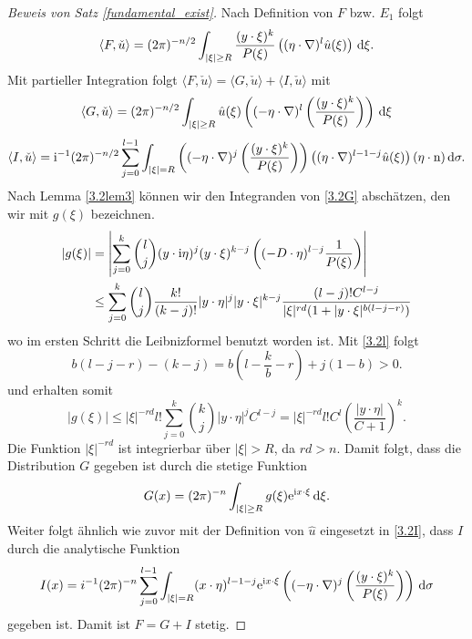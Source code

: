 \begin{proof}[Beweis von Satz \ref{fundamental_exist}]
Nach Definition von $F$ bzw. $E_1$ folgt 
\begin{equation}\label{3.2F}
\langle F, \check u\rangle = (2\pi)^{-n/2} \int_{|\xi|\ge R} \frac{(y\cdot \xi)^k}{P(\xi)} \left ( (\eta\cdot \nabla)^l \hat u(\xi)\right )\,\mathrm d \xi.
\end{equation}
Mit partieller Integration folgt $\langle F,\check u\rangle=\langle G,\check u\rangle + \langle I,\check u\rangle $ mit
\begin{equation}\label{3.2G}
\langle G,\check u\rangle = (2\pi)^{-n/2} \int_{|\xi|\ge R} \hat u(\xi) \left ( (-\eta \cdot \nabla)^l \left ( \frac{(y\cdot \xi)^k}{P(\xi)} \right ) \right )\,\mathrm d \xi
\end{equation}
\begin{equation}\label{3.2I}
\langle I,\check u\rangle = \mathrm i^{-1} (2\pi)^{-n/2} \sum_{j=0}^{l-1} \int_{|\xi|=R} \left ( (-\eta \cdot \nabla)^j \left ( \frac{(y\cdot \xi)^k}{P(\xi)}\right ) \right ) \left ( (\eta \cdot \nabla)^{l-1-j} \hat u(\xi) \right ) (\eta \cdot \mathrm n) \,\mathrm d \sigma.
\end{equation}
Nach Lemma \ref{3.2lem3} können wir den Integranden von \eqref{3.2G} abschätzen, den wir mit $g(\xi)$ bezeichnen.
\begin{equation}
\begin{split}
|g(\xi)| &= \left | \sum_{j=0}^k \binom{l}{j} (y\cdot \mathrm i\eta)^j (y \cdot \xi)^{k-j} \left ( (-D\cdot \eta)^{l-j} \frac{1}{P(\xi)} \right ) \right |\\
&\le \sum_{j=0}^k \binom{l}{j} \frac{k!}{(k-j)!} |y\cdot \eta|^j |y\cdot \xi|^{k-j}  \frac{(l-j)! C^{l-j}}{|\xi|^{rd} (1+|y\cdot \xi|^{b(l-j-r)})} 
\end{split}
\end{equation}
wo im ersten Schritt die Leibnizformel benutzt worden ist. Mit \eqref{3.2l} folgt
\begin{equation}
b(l-j-r) -(k-j)= b\left ( l-\frac{k}{b} -r \right )  + j(1-b) >0.
\end{equation}
und erhalten somit
\begin{equation}
|g(\xi)| \le |\xi|^{-rd} l! \sum_{j=0}^k \binom{k}{j} |y\cdot \eta|^j C^{l-j} = | \xi|^{-rd} l! C^l \left ( \frac{|y\cdot\eta|}{C+1} \right )^k.
\end{equation}
Die Funktion $|\xi|^{-rd}$ ist integrierbar über $|\xi|>R$, da $rd >n$.  Damit folgt, dass die Distribution $G$ gegeben ist durch die stetige Funktion
\begin{equation}
G(x) = (2\pi)^{-n} \int_{|\xi|\ge R} g(\xi) \mathrm e^{\mathrm i x\cdot \xi}\,\mathrm d \xi.
\end{equation}
Weiter folgt ähnlich wie zuvor mit der Definition von $\hat u$ eingesetzt in \eqref{3.2I}, dass $I$ durch die analytische Funktion 
\begin{equation}
I(x) = i^{-1}(2\pi)^{-n} \sum_{j=0}^{l-1} \int_{|\xi|=R} (x\cdot \eta)^{l-1-j} \mathrm e^{\mathrm i x\cdot \xi} \left ( (-\eta \cdot \nabla)^{j} \left ( \frac{(y\cdot \xi)^k}{P(\xi)} \right ) \right )\,\mathrm d \sigma
\end{equation} 
gegeben ist. Damit ist $F=G+I$ stetig.
\end{proof}

